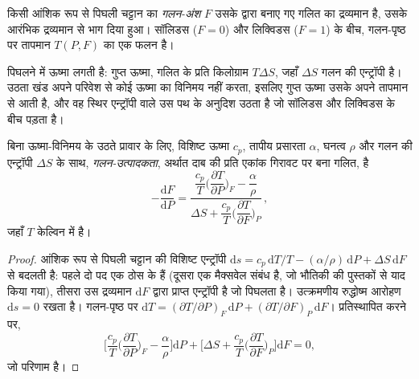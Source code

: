 \begin{definition}[गलन-अंश]\label{def:b2:mantle-melting:fraction}
किसी आंशिक रूप से पिघली चट्टान का \emph{गलन-अंश} $F$
उसके द्वारा बनाए गए गलित का द्रव्यमान है, उसके आरंभिक द्रव्यमान से भाग दिया हुआ। सॉलिडस
($F = 0$) और लिक्विडस ($F = 1$) के बीच, गलन-पृष्ठ पर तापमान
$T(P, F)$ का एक फलन है।
\end{definition}

पिघलने में ऊष्मा लगती है: गुप्त ऊष्मा, गलित के प्रति किलोग्राम $T\Delta S$, जहाँ
$\Delta S$ गलन की एन्ट्रॉपी है। उठता खंड अपने परिवेश से कोई ऊष्मा का विनिमय नहीं करता,
इसलिए गुप्त ऊष्मा उसके अपने तापमान से आती है, और वह स्थिर एन्ट्रॉपी वाले
उस पथ के अनुदिश उठता है जो सॉलिडस और लिक्विडस के बीच पड़ता है।

\begin{proposition}\label{prop:b2:mantle-melting:productivity}
बिना ऊष्मा-विनिमय के उठते प्रावार के लिए, विशिष्ट ऊष्मा $c_p$, तापीय
प्रसारता $\alpha$, घनत्व $\rho$ और गलन की एन्ट्रॉपी $\Delta S$ के साथ,
\emph{गलन-उत्पादकता}, अर्थात दाब की प्रति एकांक गिरावट पर बना
गलित, है
\[
  -\frac{\mathrm dF}{\mathrm dP} =
  \frac{\dfrac{c_p}{T}\Big(\dfrac{\partial T}{\partial P}\Big)_F - \dfrac{\alpha}{\rho}}
       {\Delta S + \dfrac{c_p}{T}\Big(\dfrac{\partial T}{\partial F}\Big)_P}\,,
\]
जहाँ $T$ केल्विन में है।
\end{proposition}

\begin{proof}
आंशिक रूप से पिघली चट्टान की विशिष्ट एन्ट्रॉपी $\mathrm ds = c_p\,
\mathrm dT/T - (\alpha/\rho)\,\mathrm dP + \Delta S\,\mathrm dF$ से बदलती है: पहले दो
पद एक ठोस के हैं (दूसरा एक मैक्सवेल संबंध है, जो
भौतिकी की पुस्तकों से याद किया गया), तीसरा उस द्रव्यमान $\mathrm dF$ द्वारा प्राप्त एन्ट्रॉपी है जो
पिघलता है। उत्क्रमणीय रुद्धोष्म आरोहण $\mathrm ds = 0$ रखता है। गलन-पृष्ठ पर
$\mathrm dT = (\partial T/\partial P)_F\,\mathrm dP + (\partial
T/\partial F)_P\,\mathrm dF$। प्रतिस्थापित करने पर,
\[
  \Big[\frac{c_p}{T}\Big(\frac{\partial T}{\partial P}\Big)_F - \frac{\alpha}{\rho}\Big]\mathrm dP
  + \Big[\Delta S + \frac{c_p}{T}\Big(\frac{\partial T}{\partial F}\Big)_P\Big]\mathrm dF = 0,
\]
जो परिणाम है।
\end{proof}

